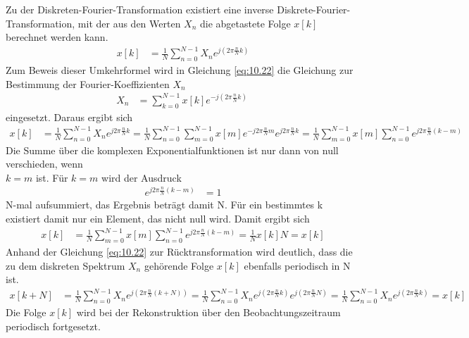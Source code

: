 Zu der Diskreten-Fourier-Transformation existiert eine inverse Diskrete-Fourier-Transformation, mit der aus den Werten \(X_{n}\) die abgetastete Folge \(x[k]\) berechnet werden kann.
\begin{align}
x[ k] &= \frac{1}{N}  \sum\limits_{n = 0}^{N - 1}X_{n}  e^{j  \left( 2  \pi  \frac{n}{N}  k \right)} \label{eq:10.22}
\end{align}
Zum Beweis dieser Umkehrformel wird in Gleichung \eqref{eq:10.22} die Gleichung zur Bestimmung der Fourier-Koeffizienten \(X_{n}\)
\begin{align}
X_{n} &= \sum\limits_{k = 0}^{N - 1}{x[ k]  e^{- j  \left( 2  \pi  \frac{n}{N}  k \right)}}\ \label{eq:10.23}
\end{align}
eingesetzt. Daraus ergibt sich
\begin{align}
x[ k] &= \frac{1}{N}  \sum\limits_{n = 0}^{N - 1}X_{n}  e^{j  2  \pi  \frac{n}{N}  k} = \frac{1}{N}  \sum\limits_{n = 0}^{N - 1}{\sum\limits_{m = 0}^{N - 1}{x[ m]}  e^{- j  2  \pi  \frac{n}{N}  m}}  e^{j  2  \pi  \frac{n}{N}  k} = \frac{1}{N}  \sum\limits_{m = 0}^{N - 1}{x[ m]}  \sum\limits_{n = 0}^{N - 1}e^{j  2  \pi  \frac{n}{N}  (k - m)} \label{eq:10.24}
\end{align}
Die Summe über die komplexen Exponentialfunktionen ist nur dann von null verschieden, wenn\\
\(k = m\) ist. Für \(k = m\) wird der Ausdruck
\begin{align}
e^{j  2  \pi  \frac{n}{N}  (k - m)} &= 1 \label{eq:10.25}
\end{align}
N-mal aufsummiert, das Ergebnis beträgt damit N. Für ein bestimmtes k existiert damit nur ein Element, das nicht null wird. Damit ergibt sich
\begin{align}
x[ k] &= \frac{1}{N}  \sum\limits_{m = 0}^{N - 1}{x[ m]}  \sum\limits_{n = 0}^{N - 1}e^{j  2  \pi  \frac{n}{N}  (k - m)} = \frac{1}{N}  x[ k]  N = x[ k] \label{eq:10.26}
\end{align}
Anhand der Gleichung \eqref{eq:10.22} zur Rücktransformation wird deutlich, dass die zu dem diskreten Spektrum \(X_{n}\) gehörende Folge \(x[k]\) ebenfalls periodisch in N ist.
\begin{align}
x[ k + N] &= \frac{1}{N}  \sum\limits_{n = 0}^{N - 1}X_{n}  e^{j  \left( 2  \pi  \frac{n}{N}  (k + N) \right)} = \frac{1}{N}  \sum\limits_{n = 0}^{N - 1}X_{n}  e^{j  \left( 2  \pi  \frac{n}{N}  k \right)}  e^{j  \left( 2  \pi  \frac{n}{N}  N \right)} = \frac{1}{N}  \sum\limits_{n = 0}^{N - 1}X_{n}  e^{j  \left( 2  \pi  \frac{n}{N}  k \right)} = x[ k] \label{eq:10.27}
\end{align}
Die Folge \(x[k]\) wird bei der Rekonstruktion über den Beobachtungszeitraum periodisch fortgesetzt.

